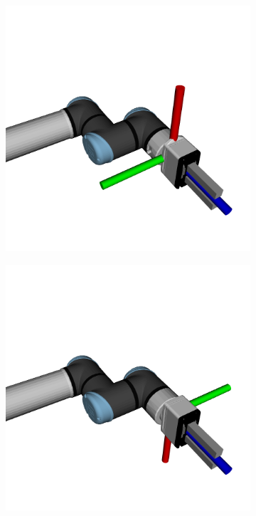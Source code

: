 \begin{figure}[h]
    \centering
    \begin{subfigure}{.166\linewidth}
        \centering
        \includegraphics[width=\linewidth]{figs/chp6/weight_x_pos.png}
    \end{subfigure}%
    \begin{subfigure}{.166\linewidth}
        \centering
        \includegraphics[width=\linewidth]{figs/chp6/weight_x_neg.png}

\end{subfigure}
\end{figure}

